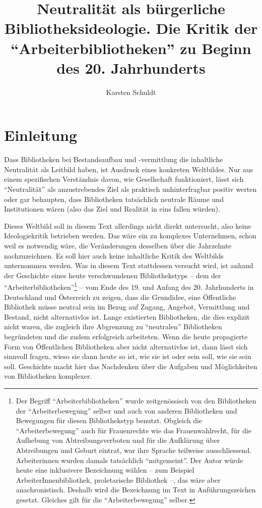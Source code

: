 \documentclass[a4paper,
fontsize=11pt,
oneside,
numbers=noperiodatend,
parskip=half-,
bibliography=totoc,
final
]{scrartcl}
\title{\LARGE{Neutralität als bürgerliche Bibliotheksideologie. Die Kritik der \enquote{Arbeiterbibliotheken} zu Beginn des 20. Jahrhunderts}}%
\author{Karsten Schuldt} %
\date{}
\begin{document}
\maketitle
\thispagestyle{fancyplain} 


\hypertarget{einleitung}{%
\section*{Einleitung}\label{einleitung}}

Dass Bibliotheken bei Bestandsaufbau und -vermittlung die inhaltliche
Neutralität als Leitbild haben, ist Ausdruck eines konkreten Weltbildes.
Nur aus einem spezifischen Verständnis davon, wie Gesellschaft
funktioniert, lässt sich \enquote{Neutralität} als anzustrebendes Ziel
als praktisch unhinterfragbar positiv werten oder gar behaupten, dass
Bibliotheken tatsächlich neutrale Räume und Institutionen wären (also
das Ziel und Realität in eins fallen würden).

Dieses Weltbild soll in diesem Text allerdings nicht direkt untersucht,
also keine Ideologiekritik betrieben werden. Das wäre ein zu komplexes
Unternehmen, schon weil es notwendig wäre, die Veränderungen desselben
über die Jahrzehnte nachzuzeichnen. Es soll hier auch keine inhaltliche
Kritik des Weltbilds unternommen werden. Was in diesem Text stattdessen
versucht wird, ist anhand der Geschichte eines heute verschwundenen
Bibliothekstyps -- dem der \enquote{Arbeiterbibliotheken}\footnote{Der
  Begriff \enquote{Arbeiterbibliotheken} wurde zeitgenössisch von den
  Bibliotheken der \enquote{Arbeiterbewegung} selber und auch von
  anderen Bibliotheken und Bewegungen für diesen Bibliothekstyp benutzt.
  Obgleich die \enquote{Arbeiterbewegung} auch für Frauenrechte wie das
  Frauenwahlrecht, für die Aufhebung von Abtreibungsverboten und für die
  Aufklärung über Abtreibungen und Geburt eintrat, war ihre Sprache
  teilweise ausschliessend. Arbeiterinnen wurden damals tatsächlich
  \enquote{mitgemeint}. Der Autor würde heute eine inklusivere
  Bezeichnung wählen -- zum Beispiel ArbeiterInnenbibliothek,
  proletarische Bibliothek --, das wäre aber anachronistisch. Deshalb
  wird die Bezeichnung im Text in Anführungszeichen gesetzt. Gleiches
  gilt für die \enquote{Arbeiterbewegung} selber.} -- vom Ende des 19.
und Anfang des 20. Jahrhunderts in Deutschland und Österreich zu zeigen,
dass die Grundidee, eine Öffentliche Bibliothek müsse neutral sein im
Bezug auf Zugang, Angebot, Vermittlung und Bestand, nicht alternativlos
ist. Lange existierten Bibliotheken, die dies explizit nicht waren, die
zugleich ihre Abgrenzung zu \enquote{neutralen} Bibliotheken begründeten
und die zudem erfolgreich arbeiteten. Wenn die heute propagierte Form
von Öffentlichen Bibliotheken aber nicht alternativlos ist, dann lässt
sich sinnvoll fragen, wieso sie dann heute so ist, wie sie ist oder sein
soll, wie sie sein soll. Geschichte macht hier das Nachdenken über die
Aufgaben und Möglichkeiten von Bibliotheken komplexer.
\end{document}
